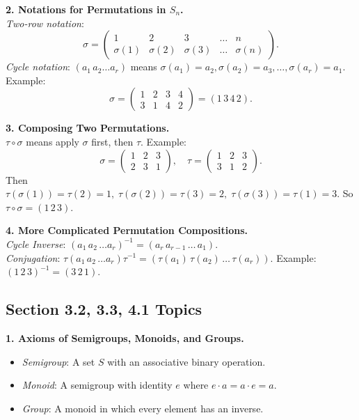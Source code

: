 \documentclass[10pt]{article}
\begin{document}
\textbf{2. Notations for Permutations in \(S_n\).}\\
\emph{Two-row notation}:
\[
\sigma = \begin{pmatrix}1 & 2 & 3 & \dots & n \\ \sigma(1) & \sigma(2) & \sigma(3) & \dots & \sigma(n)\end{pmatrix}.
\]
\emph{Cycle notation}: \((a_1\,a_2 \dots a_r)\) means \(\sigma(a_1)=a_2, \sigma(a_2)=a_3,\dots,\sigma(a_r)=a_1\).
Example: 
\[
\sigma=\begin{pmatrix}1 & 2 & 3 & 4 \\ 3 & 1 & 4 & 2\end{pmatrix} 
= (1\,3\,4\,2).
\]

\textbf{3. Composing Two Permutations.}\\
\(\tau \circ \sigma\) means apply \(\sigma\) first, then \(\tau\). Example:
\[
\sigma=\begin{pmatrix}1 & 2 & 3 \\ 2 & 3 & 1\end{pmatrix},
\quad
\tau=\begin{pmatrix}1 & 2 & 3 \\ 3 & 1 & 2\end{pmatrix}.
\]
Then \(\tau(\sigma(1)) = \tau(2)=1,\;\tau(\sigma(2))=\tau(3)=2,\;\tau(\sigma(3))=\tau(1)=3\). So \(\tau\circ\sigma = (1\,2\,3)\).

\textbf{4. More Complicated Permutation Compositions.}\\
\emph{Cycle Inverse}: \((a_1\,a_2\,\dots a_r)^{-1} = (a_r\, a_{r-1}\,\dots\,a_1)\).\\
\emph{Conjugation}: \(\tau(a_1\,a_2\,\dots a_r)\tau^{-1} = (\tau(a_1)\,\tau(a_2)\,\dots\,\tau(a_r))\).
Example: \((1\,2\,3)^{-1}=(3\,2\,1)\).

\subsection*{Section 3.2, 3.3, 4.1 Topics}

\textbf{1. Axioms of Semigroups, Monoids, and Groups.}\\
\begin{itemize}
\item \emph{Semigroup}: A set \(S\) with an associative binary operation.
\item \emph{Monoid}: A semigroup with identity \(e\) where \(e \cdot a=a \cdot e=a\).
\item \emph{Group}: A monoid in which every element has an inverse.
\end{itemize}
\end{document}

